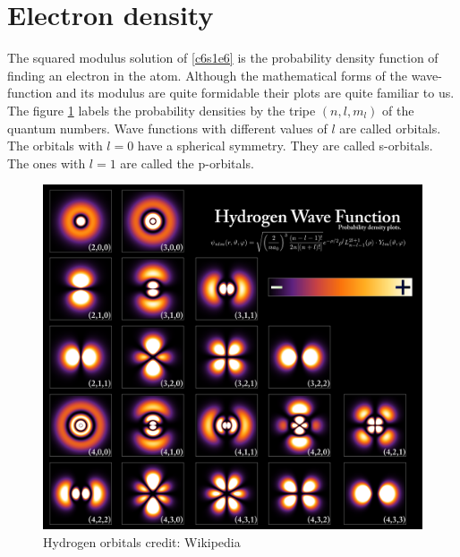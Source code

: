 \section{Electron density}\label{c6s4}
The squared modulus solution of \eqref{c6s1e6} is the probability density 
function of finding an electron in the atom. Although the mathematical forms 
of the wave-function and its modulus are quite formidable their plots are quite
familiar to us. The figure \ref{c6f1} labels the probability densities by the
tripe $(n, l, m_l)$ of the quantum numbers. Wave functions with different values
of $l$ are called orbitals. The orbitals with $l = 0$ have a spherical symmetry.
They are called s-orbitals. The ones with $l = 1$ are called the p-orbitals. 
\begin{figure}
\begin{center}
\includegraphics[scale=0.20]{Hydrogen_Density_Plots}
\caption{Hydrogen orbitals credit: Wikipedia}
\label{c6f1}
\end{center}
\end{figure}